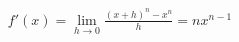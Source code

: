\documentclass[preview]{standalone}
\begin{document}
\begin{align*}
f'(x)=\lim_{h\to0}\frac{(x+h)^n-x^n}{h}=nx^{n-1}
\end{align*}
\end{document}

